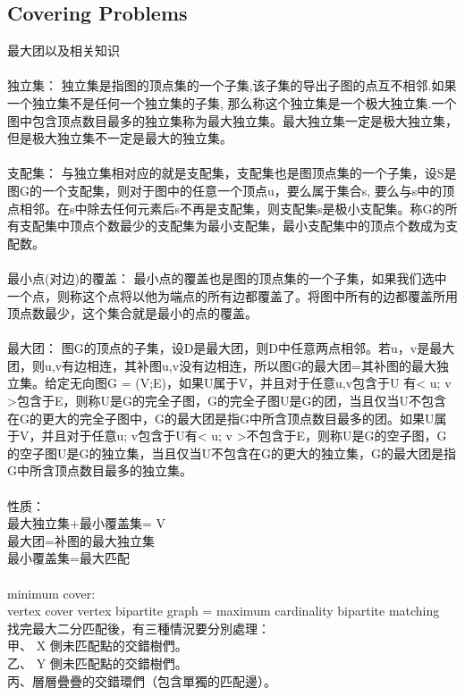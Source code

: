 \subsection{Covering Problems}
最大团以及相关知识\\
\\
独立集： 独立集是指图的顶点集的一个子集,该子集的导出子图的点互不相邻.如果一个独立集不是任何一个独立集的子集, 那么称这个独立集是一个极大独立集.一个图中包含顶点数目最多的独立集称为最大独立集。最大独立集一定是极大独立集，但是极大独立集不一定是最大的独立集。\\
\\
支配集： 与独立集相对应的就是支配集，支配集也是图顶点集的一个子集，设S是图G的一个支配集，则对于图中的任意一个顶点u，要么属于集合s, 要么与s中的顶点相邻。在s中除去任何元素后s不再是支配集，则支配集s是极小支配集。称G的所有支配集中顶点个数最少的支配集为最小支配集，最小支配集中的顶点个数成为支配数。\\
\\
最小点(对边)的覆盖： 最小点的覆盖也是图的顶点集的一个子集，如果我们选中一个点，则称这个点将以他为端点的所有边都覆盖了。将图中所有的边都覆盖所用顶点数最少，这个集合就是最小的点的覆盖。\\
\\
最大团： 图G的顶点的子集，设D是最大团，则D中任意两点相邻。若u，v是最大团，则u,v有边相连，其补图u,v没有边相连，所以图G的最大团=其补图的最大独立集。给定无向图G = (V;E)，如果U属于V，并且对于任意u,v包含于U 有< u; v >包含于E，则称U是G的完全子图，G的完全子图U是G的团，当且仅当U不包含在G的更大的完全子图中，G的最大团是指G中所含顶点数目最多的团。如果U属于V，并且对于任意u; v包含于U有< u; v >不包含于E，则称U是G的空子图，G的空子图U是G的独立集，当且仅当U不包含在G的更大的独立集，G的最大团是指G中所含顶点数目最多的独立集。\\
\\
性质： \\
最大独立集+最小覆盖集= V\\
最大团=补图的最大独立集\\
最小覆盖集=最大匹配\\
\\
minimum cover:\\
vertex cover vertex bipartite graph = maximum cardinality bipartite matching\\
找完最大二分匹配後，有三種情況要分別處理：\\
甲、 X 側未匹配點的交錯樹們。\\
乙、 Y 側未匹配點的交錯樹們。\\
丙、層層疊疊的交錯環們（包含單獨的匹配邊）。\\
